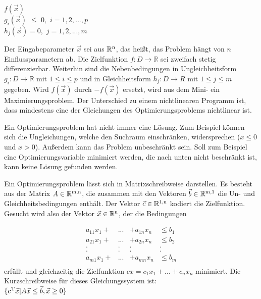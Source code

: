 \documentclass{like}
\begin{document}
\noindent\hspace*{3mm}%
$f(\vec{x}) $ \\
\noindent\hspace*{3mm}%
$g_i(\vec{x})$ $\leq$ $0,$ $i=1,2,...,p$  \\
\noindent\hspace*{50mm}%
$h_j(\vec{x})= 0,$ $j= 1,2,...,m$\\ 
\noindent\hspace*{50mm}%


Der Eingabeparameter $\vec{x}$ sei aus $\mathbb{R} \textsuperscript{n} $, das heißt, das Problem hängt von \(n\) Einflussparametern ab. Die Zielfunktion $f:D \rightarrow \mathbb{R} $ sei zweifach stetig differenzierbar. Weiterhin sind die Nebenbedingungen in Ungleichheitsform $g_i:D \rightarrow \mathbb{R}$ mit $1\leq i \leq p$ und in Gleichheitsform $h_j:D \rightarrow \!R$ mit $1\leq j \leq m$ gegeben.
Wird \(f(\vec{x})\) durch \(-f(\vec{x})\) ersetzt, wird aus dem Mini- ein Maximierungsproblem. Der Unterschied zu einem nichtlinearen Programm ist, dass mindestens eine der Gleichungen des Optimierungsproblems nichtlinear ist.

Ein Optimierungsproblem hat nicht immer eine Lösung. Zum Beispiel können sich die  Ungleichungen, welche den Suchraum einschränken, widersprechen ($x \leq 0 $ und $x > 0$). Außerdem kann das Problem unbeschränkt sein. Soll zum Beispiel eine Optimierungs\-va\-ri\-a\-ble minimiert werden, die nach unten nicht beschränkt ist, kann keine Lösung gefunden werden. 

Ein Optimierungsproblem lässt sich in Matrixschreibweise darstellen. Es besteht aus der Matrix $A \in \mathbb{R} \textsuperscript{m,n}$, die zusammen mit den Vektoren $\vec{b} \in \mathbb{R} \textsuperscript{m,1}$ die Un- und Gleichheits\-be\-din\-gung\-en enthält. Der Vektor $\vec{c} \in \mathbb{R} \textsuperscript{1,n}$ kodiert die Zielfunktion. Gesucht wird also der Vektor $\vec{x} \in \mathbb{R} \textsuperscript{n}$, der die Bedingungen

\[  \begin{array}{cccc}
a_{11} x_1 + & ... & + a_{1n} x_n & \leq b_1 \\   	
a_{21} x_1 + & ... & + a_{2n} x_n & \leq b_2 \\ 
. & . & . & . \\
. & . & . & . \\
a_{m1} x_1 + & ... & + a_{mn} x_n & \leq b_m \\
\end{array}\] 
erfüllt und gleichzeitig die Zielfunktion 
$cx=c_1 x_1 + ... + c_n x_n$ minimiert.
Die Kurz\-schreib\-wei\-se für dieses Gleichungssystem ist: \\
 $\{ c\textsuperscript{T}\vec{x} | A\vec{x} \leq \vec{b}, \vec{x} \geq 0 \}$
\end{document}
